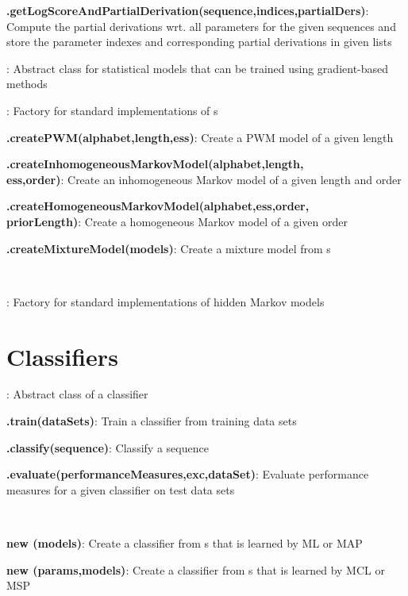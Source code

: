 \documentclass[10pt]{scrartcl}
\newcommand{\entry}[3]{{\bfseries #1#2}: #3}
\begin{document}
\begin{flushleft}
\entry{\DiffSM}{.getLogScoreAndPartialDerivation(sequence,indices,partialDers)}{Compute the partial derivations wrt. all parameters for the given sequences and store the parameter indexes and corresponding partial derivations in given lists}

\entry{\AbstractDiffSM}{}{Abstract class for statistical models that can be trained using gradient-based methods}

\entry{\DiffSMFactory}{}{Factory for standard implementations of \DiffSM s}

\entry{\DiffSMFactory}{.createPWM(alphabet,length,ess)}{Create a PWM model of a given length}

\entry{\DiffSMFactory}{.createInhomogeneousMarkovModel(alphabet,length,\\ess,order)}{Create an inhomogeneous Markov model of a given length and order}

\entry{\DiffSMFactory}{.createHomogeneousMarkovModel(alphabet,ess,order,\\priorLength)}{Create a homogeneous Markov model of a given order}

\entry{\DiffSMFactory}{.createMixtureModel(models)}{Create a mixture model from \DiffSM s}

~

\entry{\HMMFactory}{}{Factory for standard implementations of hidden Markov models}

\section{Classifiers}

\entry{\AbstractClassifier}{}{Abstract class of a classifier}

\entry{\AbstractClassifier}{.train(dataSets)}{Train a classifier from training data sets}

\entry{\AbstractClassifier}{.classify(sequence)}{Classify a sequence}

\entry{\AbstractClassifier}{.evaluate(performanceMeasures,exc,dataSet)}{Evaluate performance measures for a given classifier on test data sets}

~

\entry{new \TrainSMBasedClassifier}{(models)}{Create a classifier from \TrainSM s that is learned by ML or MAP}

\entry{new \MSPClassifier}{(params,models)}{Create a classifier from \DiffSM s that is learned by MCL or MSP}



\end{flushleft}
\end{document}
